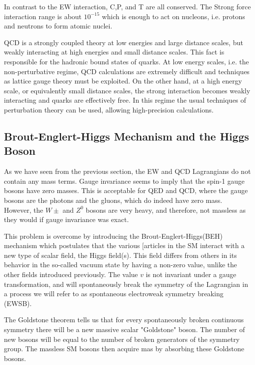 In contrast to the EW interaction, C,P, and T are all conserved. The Strong force interaction range is about $10^{-15}$ which is enough to act on nucleons, i.e. protons and neutrons to form atomic nuclei.
	
QCD is a strongly coupled theory at low energies and large distance scales, but weakly interacting at high energies and small distance scales. This fact is responsible for the hadronic bound states of quarks.
At low energy scales, i.e. the non-perturbative regime, QCD calculations are extremely difficult and techniques as lattice gauge theory must be exploited.
On the other hand, at a high energy scale, or equivalently small distance scales, the strong interaction becomes weakly interacting and quarks are effectively free. In this regime the usual techniques of perturbation theory can be used, allowing high-precision calculations.

\subsection{Brout-Englert-Higgs Mechanism and the Higgs Boson}
	
As we have seen from the previous section, the EW and QCD Lagrangians do not contain any mass terms. Gauge invariance seems to imply that the spin-1 gauge bosons have zero masses. This is acceptable for QED and QCD, where the gauge bosons are the photons and the gluons, which do indeed have zero mass. However, the $W\pm$ and $Z^{0}$ bosons are very heavy, and therefore, not massless as they would if gauge invariance was exact.

This problem is overcome by introducing the Brout-Englert-Higgs(BEH) mechanism which postulates that the various [articles in the SM interact with a new type of scalar field, the Higgs field(s). This field differs from others in its behavior in the so-called vacuum state by having a non-zero value, unlike the other fields introduced previously. The value $v$ is not invariant under a gauge transformation, and will spontaneously break the symmetry of the Lagrangian in a process we will refer to as spontaneous electroweak symmetry breaking (EWSB).

The Goldstone theorem tells us that for every spontaneously broken continuous symmetry there will be a new massive scalar "Goldstone" boson. The number of new bosons will be equal to the number of broken generators of the symmetry group. The massless SM bosons then acquire mas by absorbing these Goldstone bosons.
	
